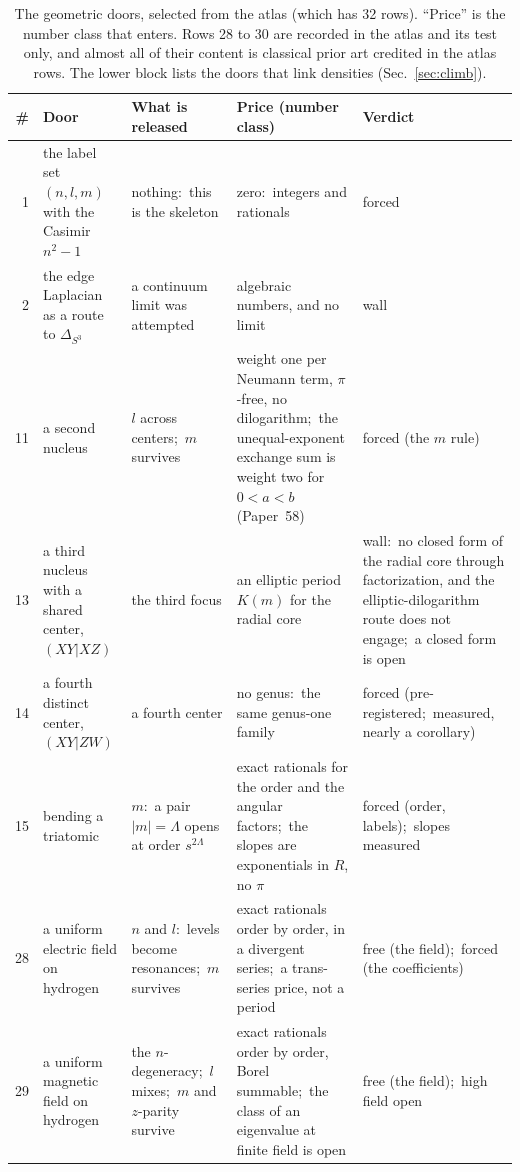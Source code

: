 \documentclass[aps,pra,twocolumn,superscriptaddress,longbibliography]{revtex4-2}
\begin{document}
\begin{table}[t]
\caption{The geometric doors, selected from the atlas (which has 32
rows).  ``Price'' is the number class that enters.  Rows 28 to 30 are
recorded in the atlas and its test only, and almost all of their content
is classical prior art credited in the atlas rows.  The lower block lists
the doors that link densities (Sec.~\ref{sec:climb}).}
\label{tab:doors}
\small
\begin{tabular}{@{}rp{3.6cm}p{4.3cm}p{5.3cm}p{2.9cm}@{}}
\toprule
\# & Door & What is released & Price (number class) & Verdict \\
\midrule
1 & the label set $(n,l,m)$ with the Casimir $n^2-1$ &
  nothing:\ this is the skeleton &
  zero:\ integers and rationals & forced \\
2 & the edge Laplacian as a route to $\Delta_{S^3}$ &
  a continuum limit was attempted &
  algebraic numbers, and no limit & wall \\
11 & a second nucleus &
  $l$ across centers;\ $m$ survives &
  weight one per Neumann term, $\pi$-free, no dilogarithm;\ the
  unequal-exponent exchange sum is weight two for $0<a<b$ (Paper~58) & forced (the $m$ rule) \\
13 & a third nucleus with a shared center, $(XY|XZ)$ &
  the third focus &
  an elliptic period $K(m)$ for the radial core &
  wall:\ no closed form of the radial core through factorization, and the
  elliptic-dilogarithm route does not engage;\ a closed form is open \\
14 & a fourth distinct center, $(XY|ZW)$ &
  a fourth center &
  no genus:\ the same genus-one family &
  forced (pre-registered;\ measured, nearly a corollary) \\
15 & bending a triatomic &
  $m$:\ a pair $|m|=\Lambda$ opens at order $s^{2\Lambda}$ &
  exact rationals for the order and the angular factors;\ the slopes are
  exponentials in $R$, no $\pi$ & forced (order, labels);\ slopes measured \\
28 & a uniform electric field on hydrogen &
  $n$ and $l$:\ levels become resonances;\ $m$ survives &
  exact rationals order by order, in a divergent series;\ a trans-series
  price, not a period & free (the field);\ forced (the coefficients) \\
29 & a uniform magnetic field on hydrogen &
  the $n$-degeneracy;\ $l$ mixes;\ $m$ and $z$-parity survive &
  exact rationals order by order, Borel summable;\ the class of an
  eigenvalue at finite field is open & free (the field);\ high field open \\

\end{tabular}
\end{table}
\end{document}
